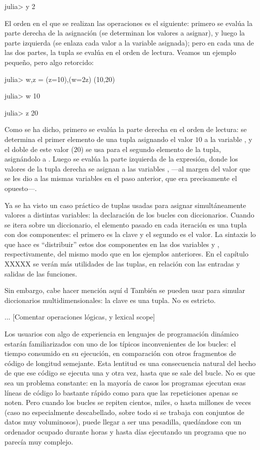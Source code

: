 ﻿\documentclass[spanish]{article}
\begin{document}
{{julia> y
2

El orden en el que se realizan las operaciones es el siguiente: primero se evalúa la parte derecha de la asignación (se determinan los valores a asignar), y luego la parte izquierda (se enlaza cada valor a la variable asignada); pero en cada una de las dos partes, la tupla se evalúa en el orden de lectura. Veamos un ejemplo pequeño, pero algo retorcido:

julia> w,z = (z=10),(w=2z)
(10,20)

julia> w
10

julia> z
20

Como se ha dicho, primero se evalúa la parte derecha en el orden de lectura: se determina el primer elemento de una tupla asignando el valor $10$ a la variable , y el doble de este valor ($20$) se usa para el segundo elemento de la tupla, asignándolo a . Luego se evalúa la parte izquierda de la expresión, donde los valores de la tupla derecha se asignan a las variables ,  ---al margen del valor que se les dio a las mismas variables en el paso anterior, que era precisamente el opuesto---.

Ya se ha visto un caso práctico de tuplas usadas para asignar simultáneamente valores a distintas variables: la declaración de los bucles  con diccionarios. Cuando se itera sobre un diccionario, el elemento pasado en cada iteración es una tupla con dos componentes: el primero es la clave y el segundo es el valor. La sintaxis  lo que hace es ``distribuir'' estos dos componentes en las dos variables  y , respectivamente, del mismo modo que en los ejemplos anteriores. En el capítulo XXXXX se verán más utilidades de las tuplas, en relación con las entradas y salidas de las funciones.

Sin embargo, cabe hacer mención aquí d
También se pueden usar para simular diccionarios multidimensionales:
la clave es una tupla. No es estricto.






...
[Comentar operaciones lógicas, y lexical scope]

Los usuarios con algo de experiencia en lenguajes de programación
dinámico estarán familiarizados con uno de los típicos inconvenientes
de los bucles: el tiempo consumido en su ejecución, en comparación con otros
fragmentos de código de longitud semejante. Esta lentitud es una
consecuencia natural del hecho de que ese código se ejecuta una y otra vez,
hasta que se sale del bucle. No es que sea un problema constante:
en la mayoría de casos los programas ejecutan esas líneas de código lo
bastante rápido como para que las repeticiones apenas se noten. Pero
cuando los bucles se repiten cientos, miles, o hasta millones de veces
(caso no especialmente descabellado, sobre todo si se trabaja con
conjuntos de datos muy voluminosos), puede llegar a ser una pesadilla,
quedándose con un ordenador ocupado durante horas y hasta días
ejecutando un programa que no parecía muy complejo.

}}
\end{document}
